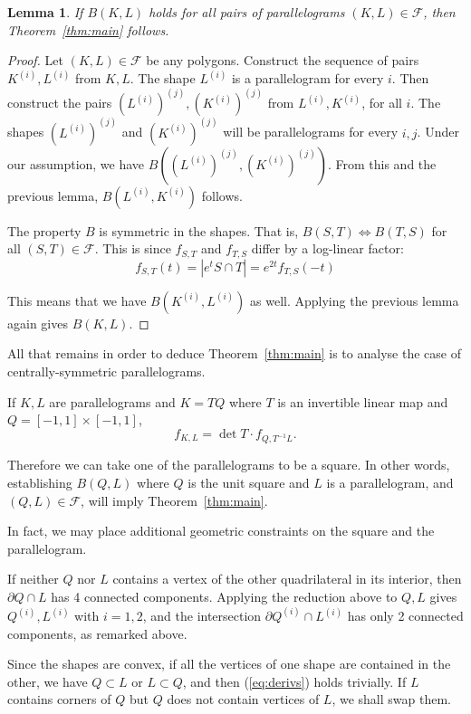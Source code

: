 \documentclass[a4paper,10pt,twoside,reqno,intlimits]{amsart}
\newtheorem*{lemma}{Lemma}
\begin{document}
\begin{lemma}
If $B(K, L)$ holds for all pairs of parallelograms $(K,L) \in {\mathcal{F}}$, then Theorem~\ref{thm:main} follows.
\end{lemma}
\begin{proof}
Let $(K, L) \in {\mathcal{F}}$ be any polygons.
Construct the sequence of pairs $K^{(i)}, L^{(i)}$ from $K,L$.
The shape $L^{(i)}$ is a parallelogram for every $i$.
Then construct the pairs $\left(L^{(i)}\right)^{(j)}, \left(K^{(i)}\right)^{(j)}$ from $L^{(i)},K^{(i)}$, for all $i$.
The shapes $\left(L^{(i)}\right)^{(j)}$ and $\left(K^{(i)}\right)^{(j)}$ will be parallelograms for every $i,j$.
Under our assumption, we have $B\left(\left(L^{(i)}\right)^{(j)}, \left(K^{(i)}\right)^{(j)}\right)$.
From this and the previous lemma, $B(L^{(i)},K^{(i)})$ follows.

The property $B$ is symmetric in the shapes.
That is, $B(S, T) \iff B(T, S)$ for all $(S, T) \in {\mathcal{F}}$.
This is since $f_{S,T}$ and $f_{T,S}$ differ by a log-linear factor:
$$ f_{S,T}(t) = |e^t S \cap T| = e^{2t} f_{T,S}(-t) $$

This means that we have $B(K^{(i)},L^{(i)})$ as well.
Applying the previous lemma again gives $B(K, L)$.
\end{proof}

All that remains in order to deduce Theorem~\ref{thm:main} is to analyse the case of centrally-symmetric
parallelograms.

If $K,L$ are parallelograms and $K = T Q$ where $T$ is an invertible linear map and $Q = [-1,1] \times [-1,1]$,
$$ f_{K,L} = \det T \cdot f_{Q,T^{-1}L} . $$

Therefore we can take one of the parallelograms to be a square.
In other words, establishing $B(Q, L)$ where $Q$ is the unit square and
$L$ is a parallelogram, and $(Q, L) \in {\mathcal{F}}$, will imply Theorem~\ref{thm:main}.

In fact, we may place additional geometric constraints on the square and the parallelogram.

If neither $Q$ nor $L$ contains a vertex of the other quadrilateral in its interior,
then ${\partial Q} \cap L$ has 4 connected components.
Applying the reduction above to $Q, L$ gives $Q^{(i)},L^{(i)}$ with $i=1,2$,
and the intersection ${\partial Q}^{(i)} \cap L^{(i)}$ has only 2 connected
components, as remarked above.

Since the shapes are convex, if all the vertices of one shape are contained in the other, we have
$Q \subset L$ or $L \subset Q$, and then (\ref{eq:derivs}) holds trivially.
If $L$ contains corners of $Q$ but $Q$ does not contain vertices of $L$, we shall swap them.
\end{document}
